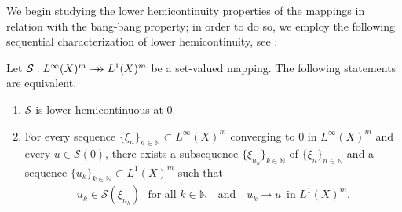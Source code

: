\documentclass[hidelinks,onefignum,onetabnum]{siamart220329}
\newcommand{\rrightarrow}{\mathrel{\mathrlap{\rightarrow}\mkern1mu\rightarrow}}
\let\twoheadrightarrow\rrightarrow
\begin{document}
We begin studying the lower hemicontinuity properties of the mappings in relation with the bang-bang property; in order to do so, we employ the following sequential characterization of lower hemicontinuity, see \cite[Theorem 17.21]{Infdim}.
\begin{proposition}
	Let $\mathcal S:L^\infty(X)^m\twoheadrightarrow L^1(X)^m$ be a set-valued mapping. The following statements are equivalent.
	\begin{enumerate}
		\item $\mathcal S$ is lower hemicontinuous at $0$.
		
		\item For every sequence  $\{\xi_n\}_{n\in\mathbb N}\subset L^\infty(X)^m$  converging to $0$ in $L^\infty(X)^m$ and every $u\in\mathcal S(0)$, there exists a  subsequence $\{\xi_{n_k}\}_{k\in\mathbb N}$ of $\{\xi_n\}_{n\in\mathbb N}$ and a sequence $\{u_k\}_{k\in\mathbb N}\subset L^1(X)^m$ such that
		\begin{align*}
		u_k\in \mathcal S(\xi_{n_k})\,\,\,\,\text{for all $k\in\mathbb N$}\quad\text{and}\quad	u_k\to u\,\,\,\text{in $L^1(X)^m$}.
		\end{align*}
	\end{enumerate}
\end{proposition}
\end{document}
